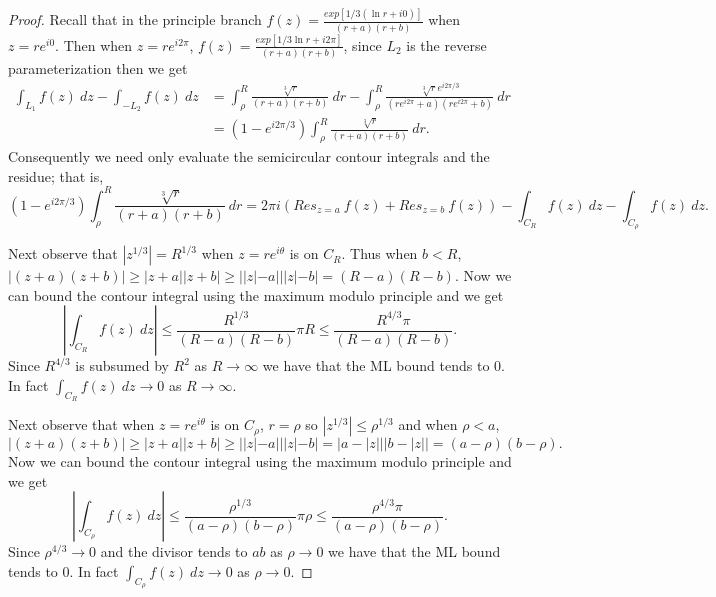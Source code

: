 \documentclass[11pt]{amsart}
\theoremstyle{definition}
\numberwithin{theorem}{section}
\numberwithin{definition}{section}
\numberwithin{equation}{section}
\newcommand{\parens}[1]{ \left( #1 \right) }
\begin{document}
\begin{proof}
	Recall that  in the principle branch $f(z) = \frac{exp[1/3(\ln r + i0)]}{(r+a)(r+b)}$ when $z = re^{i0}.$ 
	Then when $z = re^{i2\pi}$, $f(z) = \frac{exp[1/3\ln r + i 2\pi]}{(r+a)(r+b)}$, since $L_2$ is the reverse parameterization then we get
	\begin{equation*}
	\begin{aligned}
		\int_{L_1} f(z)\ dz  - \int_{-L_2} f(z)\ dz 
		&= \int_{\rho}^R \frac{\sqrt[3]{r}}{(r+a)(r+b)}\ dr - \int_{\rho}^R \frac{\sqrt[3]{r}e^{i2\pi/3}}{(re^{i2\pi}+a)(re^{i2\pi}+b)}\ dr\\
		&=(1 - e^{i2\pi/3})\int_{\rho}^R \frac{\sqrt[3]{r}}{(r+a)(r+b)}\ dr.
	\end{aligned}
	\end{equation*}
	Consequently we need only evaluate the semicircular contour integrals and the residue; that is,
	\begin{equation*}
		(1 - e^{i2\pi/3})\int_{\rho}^R \frac{\sqrt[3]{r}}{(r+a)(r+b)}\ dr  =  2\pi i \parens{Res_{z = a}\ f(z) +   Res_{z = b}\ f(z)}   -\int_{C_R} f(z)\ dz  -\int_{C_\rho} f(z)\ dz.
	\end{equation*}


	Next observe that $|z^{1/3}| = R^{1/3}$ when $z = re^{i\theta}$ is on $C_R$. Thus when $b < R$, $|(z+a)(z+b)| \geq |z+a||z+b| \geq ||z| - a|||z| - b| = (R-a)(R-b).$ Now we can bound the contour integral using the maximum modulo principle and we get
	\begin{equation*}
		\left|\int_{C_R} f(z)\ dz\right| \leq \frac{R^{1/3}}{(R-a)(R-b)} \pi R \leq \frac{R^{4/3}\pi}{(R-a)(R-b)} .
	\end{equation*}
	Since $R^{4/3}$ is subsumed by $R^2$ as $R \to \infty$ we have that the ML bound tends to $0$. In fact
	$\int_{C_R} f(z)\ dz \to 0$ as $R \to \infty. $

	Next observe that when $z = re^{i\theta}$ is on $C_\rho$, $r = \rho$ so $|z^{1/3}| \leq \rho^{1/3}$ and
	when $\rho < a$, $|(z+a)(z+b)| \geq |z+a||z+b| \geq ||z| - a|||z| - b| = |a - |z|||b - |z|| = (a - \rho)(b-\rho).$ Now we can bound the contour integral using the maximum modulo principle and we get
	\begin{equation*}
		\left|\int_{C_\rho} f(z)\ dz\right| \leq \frac{\rho^{1/3}}{(a- \rho)(b - \rho)} \pi \rho \leq \frac{\rho^{4/3}\pi}{(a - \rho)(b-\rho)} .
	\end{equation*}
	Since $\rho^{4/3} \to 0 $  and the divisor tends to $ab$ as $\rho \to 0$ we have that the ML bound tends to $0$. In fact
	$\int_{C_\rho} f(z)\ dz \to 0$ as $\rho \to 0.$




\end{proof}
\end{document}
